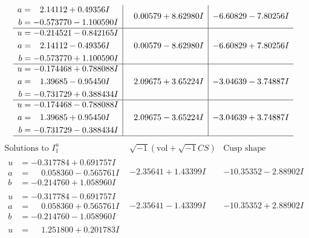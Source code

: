 \documentclass[1p]{elsarticle_modified}
\theoremstyle{definition}
\newcommand{\I}{\sqrt{-1}}
\begin{document}
$$\begin{array}{c|c|c}
\begin{aligned}
a &= \phantom{-}2.14112 + 0.49356 I \\
b &= -0.573770 - 1.100590 I\end{aligned}
 & \phantom{-}0.00579 + 8.62980 I & -6.60829 - 7.80256 I \\ \hline\begin{aligned}
u &= -0.214521 - 0.842165 I \\
a &= \phantom{-}2.14112 - 0.49356 I \\
b &= -0.573770 + 1.100590 I\end{aligned}
 & \phantom{-}0.00579 - 8.62980 I & -6.60829 + 7.80256 I \\ \hline\begin{aligned}
u &= -0.174468 + 0.788088 I \\
a &= \phantom{-}1.39685 - 0.95450 I \\
b &= -0.731729 + 0.388434 I\end{aligned}
 & \phantom{-}2.09675 + 3.65224 I & -3.04639 - 3.74887 I \\ \hline\begin{aligned}
u &= -0.174468 - 0.788088 I \\
a &= \phantom{-}1.39685 + 0.95450 I \\
b &= -0.731729 - 0.388434 I\end{aligned}
 & \phantom{-}2.09675 - 3.65224 I & -3.04639 + 3.74887 I\\
 \hline 
 \end{array}$$\newpage$$\begin{array}{c|c|c}  
\text{Solutions to }I^u_{1}& \I (\text{vol} + \sqrt{-1}CS) & \text{Cusp shape}\\
 \hline 
\begin{aligned}
u &= -0.317784 + 0.691757 I \\
a &= \phantom{-}0.058360 - 0.565761 I \\
b &= -0.214760 + 1.058960 I\end{aligned}
 & -2.35641 + 1.43399 I & -10.35352 - 2.88902 I \\ \hline\begin{aligned}
u &= -0.317784 - 0.691757 I \\
a &= \phantom{-}0.058360 + 0.565761 I \\
b &= -0.214760 - 1.058960 I\end{aligned}
 & -2.35641 - 1.43399 I & -10.35352 + 2.88902 I \\ \hline\begin{aligned}
u &= \phantom{-}1.251800 + 0.201783 I \\

\end{aligned}
\end{array}$$
\end{document}
